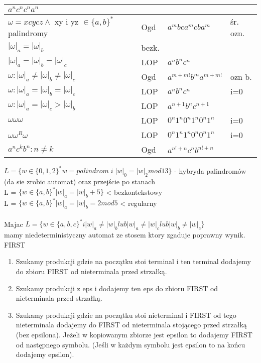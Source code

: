 \begin{tabular}{l|l|l|l}
    $a^{n}c^{n}c^{n}a^{n}$ \\
  \hline
    $\omega = xcycz \wedge$ xy i yz $\in \lbrace a,b \rbrace ^{*}$palindromy & Ogd & $a^{m}bca^{m}cba^{m}$ & śr. ozn. \\
  \hline
    $|\omega|_{a} = |\omega|_{b}$ & bezk. & \\
  \hline
    $|\omega|_{a} = |\omega|_{b}= |\omega|_{c}$ & LOP & $a^{n}b^{n}c^{n}$ & \\
  \hline
    $\omega : |\omega|_{a} \neq |\omega|_{b} \neq |\omega|_{c}$ & Ogd & $a^{m+m!}b^{m}a^{m+m!}$ & ozn b.\\
  \hline 
    $\omega : |\omega|_{a} = |\omega|_{b} = |\omega|_{c}$ & LOP & $a^{n}b^{n}c^{n}$ & i=0\\
  \hline
    $\omega : |\omega|_{a} = |\omega|_{c} > |\omega|_{b}$ & LOP & $a^{n+1}b^{n}c^{n+1}$ &\\
  \hline
    $\omega\omega\omega$ & LOP & $0^{n}1^{n}0^{n}1^{n}0^{n}1^{n}$ & i=0\\
  \hline
    $\omega\omega^{R}\omega$ & LOP & $0^{n}1^{n}1^{n}0^{n}0^{n}1^{n}$ & i=0\\
  \hline
    $a^{n}c^{k}b^{n} : n \neq k$ & Ogd & $a^{n!+n}c^{n}b^{n!+n}$& \\
\end{tabular}

$ L = \{ w \in \{0, 1, 2 \}^* w = palindrom \; i \; |w|_0 = |w|_2 mod 13\} $ - hybryda palindromów (da sie zrobic automat) oraz przejście po stanach \\
L = $ \{ w \in \{a, b \}^* |w|_a = |w|_b + 5 \} $ < bezkontekstowy \\
L = $ \{ w \in \{a, b \}^* |w|_a = |w|_b = 2 mod 5 $ < regularny \\
\\

Majac $ L = \{ w \in \{a, b, c\}^* i |w|_a \neq |w|_b lub |w|_a \neq |w|_c lub |w|_b \neq |w|_c \} $ \\
mamy niedeterministyczny automat ze stosem ktory zgaduje poprawny wynik. \\

FIRST
\begin{enumerate}
  \item Szukamy produkcji gdzie na początku stoi terminal i ten terminal dodajemy do zbioru FIRST od nieterminala przed strzałką.
  \item Szukamy produkcji z eps i dodajemy ten eps do zbioru FIRST od nieterminala przed strzałką.
  \item Szukamy produkcji gdzie na początku stoi nieterminal i FIRST od tego nieterminala dodajemy do FIRST od nieterminala stojącego przed strzałką (bez epsilona). Jeżeli w kopiowanym zbiorze jest epsilon to dodajemy FIRST od następnego symbolu. (Jeśli w każdym symbolu jest epsilon to na końcu dodajemy epsilon).
\end{enumerate}

